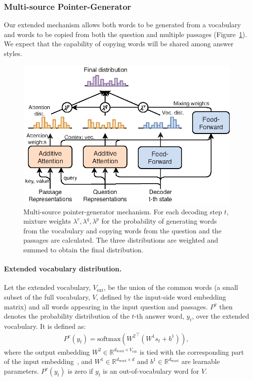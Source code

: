\documentclass[11pt,a4paper]{article}
\theoremstyle{mydef}
\theoremstyle{myprob}
\begin{document}
\subsubsection{Multi-source Pointer-Generator}
\label{sec:copy}

Our extended mechanism allows both words to be generated from a vocabulary and words to be copied from both the question and multiple passages (Figure~\ref{fig:copy}). 
We expect that the capability of copying words will be shared among answer styles. 

\begin{figure}[t!]
\centering
\includegraphics[width=.47\textwidth]{./images/Masque_copy3.eps}
\caption{Multi-source pointer-generator mechanism. 
For each decoding step $t$, mixture weights $\lambda^v, \lambda^q, \lambda^p$ 
for the probability of generating words from the vocabulary and copying words from the question and the passages are calculated.
The three distributions are weighted and summed to obtain the final distribution.
}
\label{fig:copy}
\end{figure}

\paragraph{Extended vocabulary distribution.}
Let the extended vocabulary,  $V_\mathrm{ext}$, be the union of the common words (a small subset of the full vocabulary, $V$, defined by the 
input-side word embedding matrix) and all words appearing in the input question and passages. $P^v$ then denotes the probability distribution of the $t$-th answer word, $y_t$, over the extended vocabulary. It is defined as:
\begin{align}
\nonumber
P^v(y_t)  =\mathrm{softmax}({W^2}^\top (W^1 s_t  + b^1)),
\end{align}
where the output embedding $W^2 \in \mathbb{R}^{d_\mathrm{word} \times V_\mathrm{ext}}$ is tied with the corresponding part of the input embedding~\citep{InanKS17}, and $W^1 \in \mathbb{R}^{d_\mathrm{word} \times d}$ and $b^1 \in \mathbb{R}^{d_\mathrm{word}}$ are learnable parameters. $P^v(y_t)$ is zero if $y_t$ is an out-of-vocabulary word for $V$.
\end{document}
